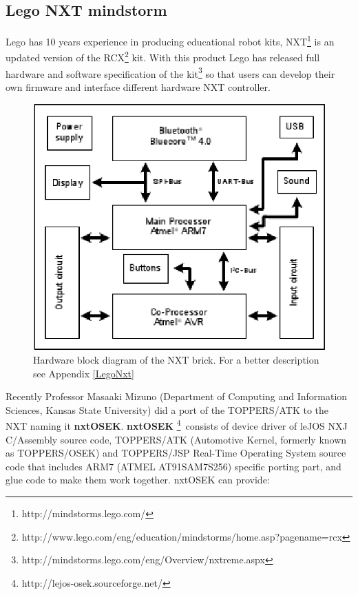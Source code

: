 \subsection{Lego NXT mindstorm}
Lego has 10 years experience in producing educational robot kits, NXT\footnote{http://mindstorms.lego.com/} is an updated version of the RCX\footnote{http://www.lego.com/eng/education/mindstorms/home.asp?pagename=rcx} kit. With this product Lego has released full hardware and software specification of the kit\footnote{http://mindstorms.lego.com/eng/Overview/nxtreme.aspx} so that users can develop their own firmware and interface different hardware NXT controller.
\begin{figure}[htbp]
\begin{center}
\includegraphics[scale=0.6]{figures/legonxt/nxthardware.eps}
\caption[Lego NXT robot implementation]{Hardware block diagram of the NXT brick. For a better description see Appendix \ref{LegoNxt}}
\end{center}
\end{figure}
Recently Professor Masaaki Mizuno (Department of Computing and Information Sciences, Kansas State University) did a port of the TOPPERS/ATK to the NXT naming it \textbf{nxtOSEK}.
\textbf{nxtOSEK }\footnote{http://lejos-osek.sourceforge.net/}\ consists of device driver of  leJOS NXJ C/Assembly source code, TOPPERS/ATK (Automotive Kernel, formerly known as TOPPERS/OSEK) and TOPPERS/JSP Real-Time Operating System source code that includes ARM7 (ATMEL AT91SAM7S256) specific porting part, and glue code to make them work together. nxtOSEK can provide:


